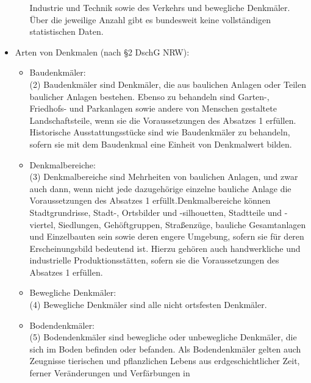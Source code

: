 \documentclass[fleqn,twoside,dvipsnames]{article}
\begin{document}
\begin{itemize}
\begin{itemize}
                        Industrie und Technik sowie des Verkehrs und bewegliche Denkmäler. Über die
                        jeweilige Anzahl gibt es bundesweit keine vollständigen statistischen Daten.
                \end{itemize}
            \item Arten von Denkmalen (nach §2 DschG NRW):
                \begin{itemize}
                    \item Baudenkmäler:\\ (2) Baudenkmäler sind Denkmäler, die aus baulichen Anlagen oder Teilen baulicher Anlagen
                                            bestehen. Ebenso zu behandeln sind Garten-, Friedhofs- und Parkanlagen sowie andere von
                                            Menschen gestaltete Landschaftsteile, wenn sie die Voraussetzungen des Absatzes 1 erfüllen.
                                            Historische Ausstattungsstücke sind wie Baudenkmäler zu behandeln, sofern sie mit dem
                                            Baudenkmal eine Einheit von Denkmalwert bilden.
                    \item Denkmalbereiche:\\ (3) Denkmalbereiche sind Mehrheiten von baulichen Anlagen, und zwar auch dann, wenn
                                                nicht jede dazugehörige einzelne bauliche Anlage die Voraussetzungen des Absatzes 1 erfüllt.Denkmalbereiche können Stadtgrundrisse, Stadt-, Ortsbilder und -silhouetten, Stadtteile und -viertel, Siedlungen, Gehöftgruppen, Straßenzüge, bauliche Gesamtanlagen und Einzelbauten sein sowie deren engere Umgebung, sofern sie für deren Erscheinungsbild
                                                bedeutend ist. Hierzu gehören auch handwerkliche und industrielle Produktionsstätten, sofern sie die Voraussetzungen des Absatzes 1 erfüllen.
                    \item Bewegliche Denkmäler:\\ (4) Bewegliche Denkmäler sind alle nicht ortsfesten Denkmäler.
                    \item Bodendenkmäler:\\ (5) Bodendenkmäler sind bewegliche oder unbewegliche Denkmäler, die sich im Boden
                                                befinden oder befanden. Als Bodendenkmäler gelten auch Zeugnisse tierischen und
                                                pflanzlichen Lebens aus erdgeschichtlicher Zeit, ferner Veränderungen und Verfärbungen in

\end{itemize}
\end{itemize}
\end{document}
